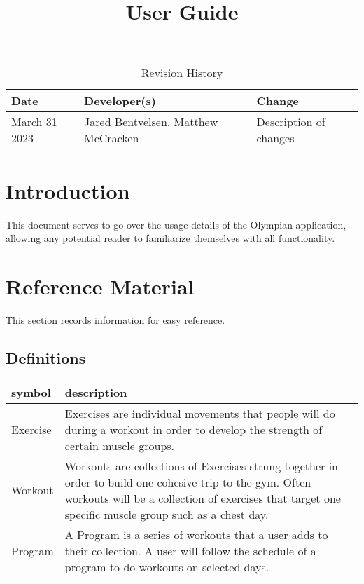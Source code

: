 \documentclass{article}
\title{User Guide\\\progname}
\author{\authname}
\date{}
\begin{document}
\begin{table}[hp]
\caption{Revision History} \label{TblRevisionHistory}
\begin{tabularx}{\textwidth}{llX}
\toprule
\textbf{Date} & \textbf{Developer(s)} & \textbf{Change}\\
\midrule
March 31 2023 & Jared Bentvelsen, Matthew McCracken & Description of changes\\
\bottomrule
\end{tabularx}
\end{table}

\newpage

\maketitle

\tableofcontents

\section{Introduction}

This document serves to go over the usage details of the Olympian application, allowing any potential reader to familiarize themselves with all functionality.

\section{Reference Material}

This section records information for easy reference.

\subsection{Definitions}

\renewcommand{\arraystretch}{1.2}
\begin{tabular}{l l} 
  \toprule		
  \textbf{symbol} & \textbf{description}\\
  \midrule   
  Exercise & Exercises are individual movements that people will do during a workout in order to develop the strength of certain muscle groups.\\
  Workout & Workouts are collections of Exercises strung together in order to build one cohesive trip to the gym. Often workouts will be a collection of exercises that target one specific muscle group such as a chest day.\\
  Program & A Program is a series of workouts that a user adds to their collection. A user will follow the schedule of a program to do workouts on selected days.\\
  \bottomrule
\end{tabular}\\
\end{document}
